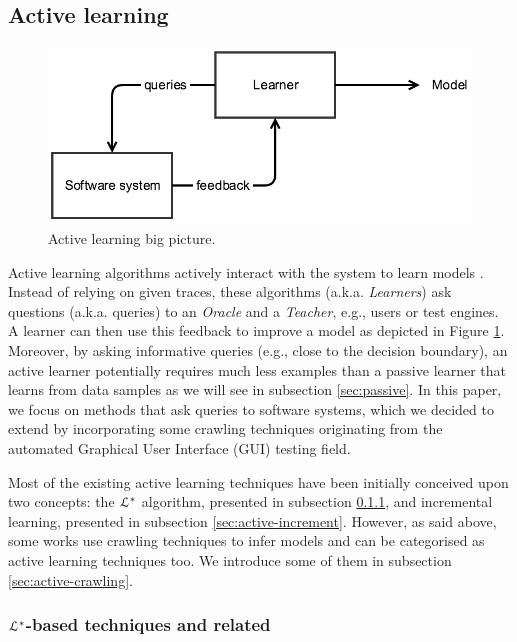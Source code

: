 \subsection{Active learning}
\label{sec:active}

\begin{figure}[h]
    \begin{center}
        \includegraphics[width=0.9\linewidth]{figures/active.png}
    \end{center}

    \caption{Active learning big picture.}
    \label{fig:active}
\end{figure}

Active learning algorithms actively interact with the system to
learn models \cite{settles.tr09}. Instead of relying on given
traces, these algorithms (a.k.a. \textit{Learners}) ask questions
(a.k.a.  queries) to an \textit{Oracle} and a \textit{Teacher},
e.g., users or test engines. A learner can then use this feedback
to improve a model as depicted in Figure \ref{fig:active}.
Moreover, by asking informative queries (e.g., close to the
decision boundary), an active learner potentially requires much
less examples than a passive learner that learns from data
samples as we will see in subsection \ref{sec:passive}. In this
paper, we focus on methods that ask queries to software systems,
which we decided to extend by incorporating some crawling
techniques originating from the automated Graphical User
Interface (GUI) testing field.

Most of the existing active learning techniques have been
initially conceived upon two concepts: the $\EuScript{L}^*$
algorithm, presented in subsection \ref{sec:active-letoile}, and
incremental learning, presented in subsection
\ref{sec:active-increment}. However, as said above, some works
use crawling techniques to infer models and can be categorised as
active learning techniques too. We introduce some of them in
subsection \ref{sec:active-crawling}.

\subsubsection{$\EuScript{L}^*$-based techniques and related}
\label{sec:active-letoile}


